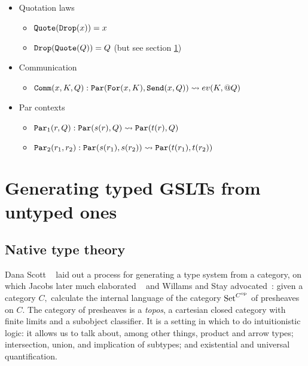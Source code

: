 \documentclass{article}
\begin{document}
\begin{itemize}
\begin{itemize}
        \item Quotation laws
            \begin{itemize}
                \item ${\tt Quote}({\tt Drop}(x)) = x$
                \item ${\tt Drop}({\tt Quote}(Q)) = Q$ (but see section \ref{TypedGSLTs})
            \end{itemize}
        \item Communication
            \begin{itemize}
                \item ${\tt Comm}(x, K, Q) : {\tt Par}({\tt For}(x, K), {\tt Send}(x, Q)) \leadsto ev(K, @Q)$
            \end{itemize}
        \item Par contexts
            \begin{itemize}
                \item ${\tt Par}_1(r, Q) : {\tt Par}(s(r), Q) \leadsto {\tt Par}(t(r), Q)$
                \item ${\tt Par}_2(r_1, r_2) : {\tt Par}(s(r_1), s(r_2)) \leadsto {\tt Par}(t(r_1), t(r_2))$
            \end{itemize}
    \end{itemize}
\end{itemize}

\section{Generating typed GSLTs from untyped ones}
\label{TypedGSLTs}

\subsection{Native type theory}
Dana Scott ~\cite{Scott1980} laid out a process for generating a type system from a category, on which Jacobs later much elaborated ~\cite{Jacobs1999} and Willams and Stay advocated~\cite{WilliamsStay2021}:
given a category $C,$ calculate the internal language of the category ${\rm Set}^{C^{\rm op}}$ of presheaves on $C.$  The category of presheaves is a {\em topos}, a cartesian closed category with finite limits and a subobject classifier.  It is a setting in which to do intuitionistic logic: it allows us to talk about, among other things, product and arrow types; intersection, union, and implication of subtypes; and existential and universal quantification.  
\end{document}
